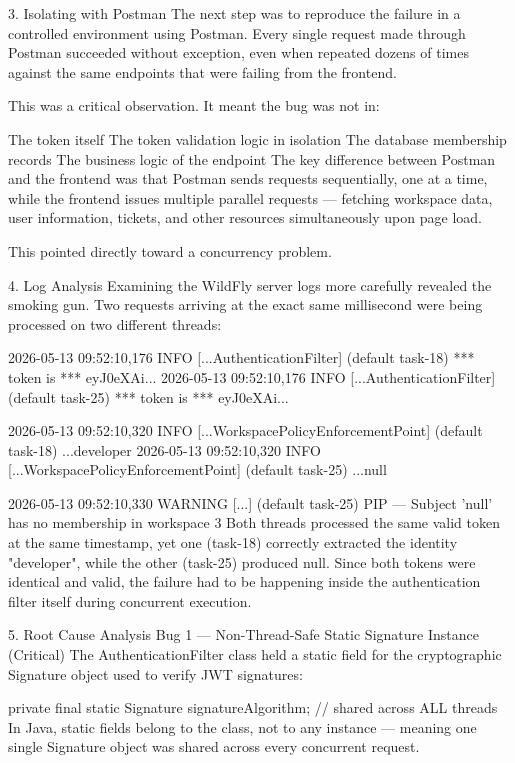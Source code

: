 3. Isolating with Postman
The next step was to reproduce the failure in a controlled environment using Postman. Every single request made through Postman succeeded without exception, even when repeated dozens of times against the same endpoints that were failing from the frontend.

This was a critical observation. It meant the bug was not in:

The token itself
The token validation logic in isolation
The database membership records
The business logic of the endpoint
The key difference between Postman and the frontend was that Postman sends requests sequentially, one at a time, while the frontend issues multiple parallel requests — fetching workspace data, user information, tickets, and other resources simultaneously upon page load.

This pointed directly toward a concurrency problem.

4. Log Analysis
Examining the WildFly server logs more carefully revealed the smoking gun. Two requests arriving at the exact same millisecond were being processed on two different threads:


2026-05-13 09:52:10,176 INFO [...AuthenticationFilter] (default task-18) *** token is *** eyJ0eXAi...
2026-05-13 09:52:10,176 INFO [...AuthenticationFilter] (default task-25) *** token is *** eyJ0eXAi...

2026-05-13 09:52:10,320 INFO [...WorkspacePolicyEnforcementPoint] (default task-18) ...developer
2026-05-13 09:52:10,320 INFO [...WorkspacePolicyEnforcementPoint] (default task-25) ...null

2026-05-13 09:52:10,330 WARNING [...] (default task-25) PIP — Subject 'null' has no membership in workspace 3
Both threads processed the same valid token at the same timestamp, yet one (task-18) correctly extracted the identity "developer", while the other (task-25) produced null. Since both tokens were identical and valid, the failure had to be happening inside the authentication filter itself during concurrent execution.

5. Root Cause Analysis
Bug 1 — Non-Thread-Safe Static Signature Instance (Critical)
The AuthenticationFilter class held a static field for the cryptographic Signature object used to verify JWT signatures:


private final static Signature signatureAlgorithm; // shared across ALL threads
In Java, static fields belong to the class, not to any instance — meaning one single Signature object was shared across every concurrent request.

